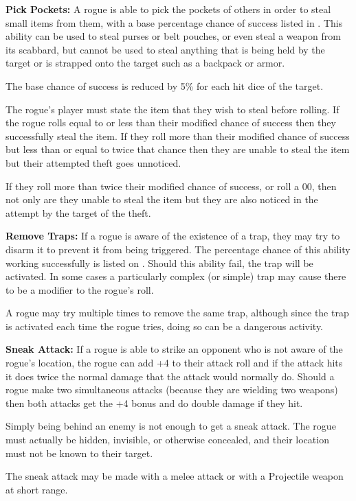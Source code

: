 \begin{multicols*}{2}
\textbf{Pick Pockets:} A rogue is able to pick the pockets of others in order to steal small items from them, with a base percentage chance of success listed in . This ability can be used to steal purses or belt pouches, or even steal a weapon from its scabbard, but cannot be used to steal anything that is being held by the target or is strapped onto the target such as a backpack or armor.

The base chance of success is reduced by 5\% for each hit dice of the target.

The rogue’s player must state the item that they wish to steal before rolling. If the rogue rolls equal to or less than their modified chance of success then they successfully steal the item. If they roll more than their modified chance of success but less than or equal to twice that chance then they are unable to steal the item but their attempted theft goes unnoticed.

If they roll more than twice their modified chance of success, or roll a 00, then not only are they unable to steal the item but they are also noticed in the attempt by the target of the theft.

\textbf{Remove Traps:} If a rogue is aware of the existence of a trap, they may try to disarm it to prevent it from being triggered. The percentage chance of this ability working successfully is listed on . Should this ability fail, the trap will be activated. In some cases a particularly complex (or simple) trap may cause there to be a modifier to the rogue’s roll.

A rogue may try multiple times to remove the same trap, although since the trap is activated each time the rogue tries, doing so can be a dangerous activity.

\textbf{Sneak Attack:} If a rogue is able to strike an opponent who is not aware of the rogue’s location, the rogue can add +4 to their attack roll and if the attack hits it does twice the normal damage that the attack would normally do. Should a rogue make two simultaneous attacks (because they are wielding two weapons) then both attacks get the +4 bonus and do double damage if they hit.

Simply being behind an enemy is not enough to get a sneak attack. The rogue must actually be hidden, invisible, or otherwise concealed, and their location must not be known to their target.

The sneak attack may be made with a melee attack or with a Projectile weapon at short range.


\end{multicols*}
